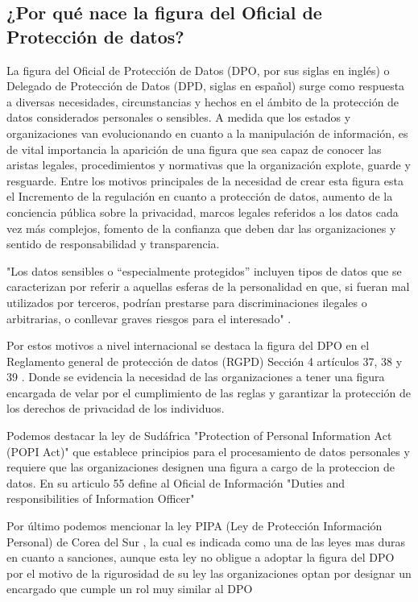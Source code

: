 \documentclass[stu, 11pt, letterpaper, donotrepeattitle, floatsintext, natbib]{apa7}
\begin{document}
\subsection{¿Por qué nace la figura del Oficial de Protección de datos?} 
La figura del Oficial de Protección de Datos (DPO, por sus siglas en inglés) o Delegado de Protección de Datos (DPD, siglas en español) surge como respuesta a diversas necesidades, circunstancias y hechos en el ámbito de la protección de datos considerados personales o sensibles. A medida que los estados y organizaciones van evolucionando en cuanto a la manipulación de información, es de vital importancia la aparición de una figura que sea capaz de conocer las aristas legales, procedimientos y normativas que la organización explote, guarde y resguarde.
	Entre los motivos principales de la necesidad de crear esta figura esta el Incremento de la regulación en cuanto a protección de datos, aumento de la conciencia pública sobre la privacidad, marcos legales referidos a los datos cada vez más complejos, fomento de la confianza que deben dar las organizaciones y sentido de responsabilidad y transparencia.

"Los datos sensibles o “especialmente protegidos” incluyen tipos de datos que se caracterizan por referir a aquellas esferas de la personalidad en que, si fueran mal utilizados por terceros, podrían prestarse para discriminaciones ilegales o arbitrarias, o conllevar graves riesgos para el interesado" \citep*{DerechoInformatico}.

Por estos motivos a nivel internacional se destaca la figura del DPO en el Reglamento general de protección de datos (RGPD) Sección 4 artículos 37, 38 y 39 \citep{rgpd}. Donde se evidencia la necesidad de las organizaciones a tener una figura encargada de velar por el cumplimiento de las reglas y garantizar la protección de los derechos de privacidad de los individuos. 

Podemos destacar la ley de Sudáfrica "Protection of Personal Information Act (POPI Act)" \citep{sudafrica} que establece principios para el procesamiento de datos personales y requiere que las organizaciones designen una figura a cargo de la proteccion de datos. En su articulo 55 define al Oficial de Información "Duties and responsibilities of Information Officer" \citep{sudafrica2} 

Por último podemos mencionar la ley PIPA (Ley de Protección Información Personal) de Corea del Sur\citep{corea} , la cual es indicada como una de las leyes mas duras en cuanto a sanciones, aunque esta ley no obligue a adoptar la figura del DPO por el motivo de la rigurosidad de su ley las organizaciones optan por designar un encargado que cumple un rol muy similar al DPO \citep{corea2}
\end{document}
